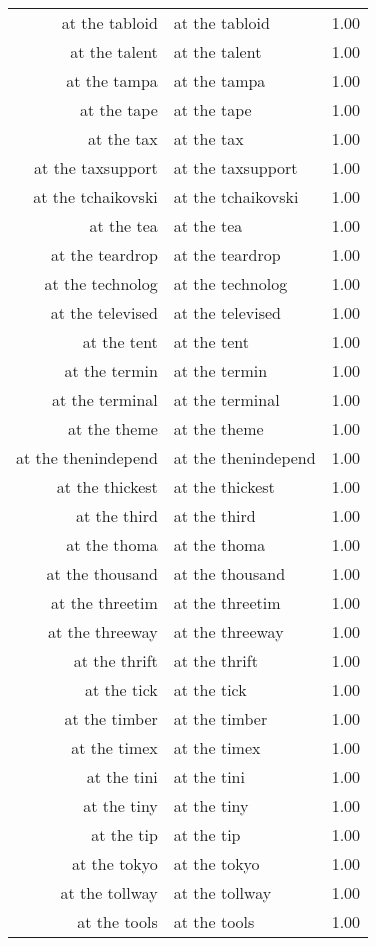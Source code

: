 \begin{table}[ht]
\begin{tabular}{rlr}
  at the tabloid & at the tabloid & 1.00 \\ 
  at the talent & at the talent & 1.00 \\ 
  at the tampa & at the tampa & 1.00 \\ 
  at the tape & at the tape & 1.00 \\ 
  at the tax & at the tax & 1.00 \\ 
  at the taxsupport & at the taxsupport & 1.00 \\ 
  at the tchaikovski & at the tchaikovski & 1.00 \\ 
  at the tea & at the tea & 1.00 \\ 
  at the teardrop & at the teardrop & 1.00 \\ 
  at the technolog & at the technolog & 1.00 \\ 
  at the televised & at the televised & 1.00 \\ 
  at the tent & at the tent & 1.00 \\ 
  at the termin & at the termin & 1.00 \\ 
  at the terminal & at the terminal & 1.00 \\ 
  at the theme & at the theme & 1.00 \\ 
  at the thenindepend & at the thenindepend & 1.00 \\ 
  at the thickest & at the thickest & 1.00 \\ 
  at the third & at the third & 1.00 \\ 
  at the thoma & at the thoma & 1.00 \\ 
  at the thousand & at the thousand & 1.00 \\ 
  at the threetim & at the threetim & 1.00 \\ 
  at the threeway & at the threeway & 1.00 \\ 
  at the thrift & at the thrift & 1.00 \\ 
  at the tick & at the tick & 1.00 \\ 
  at the timber & at the timber & 1.00 \\ 
  at the timex & at the timex & 1.00 \\ 
  at the tini & at the tini & 1.00 \\ 
  at the tiny & at the tiny & 1.00 \\ 
  at the tip & at the tip & 1.00 \\ 
  at the tokyo & at the tokyo & 1.00 \\ 
  at the tollway & at the tollway & 1.00 \\ 
  at the tools & at the tools & 1.00 \\ 

\end{tabular}
\end{table}
